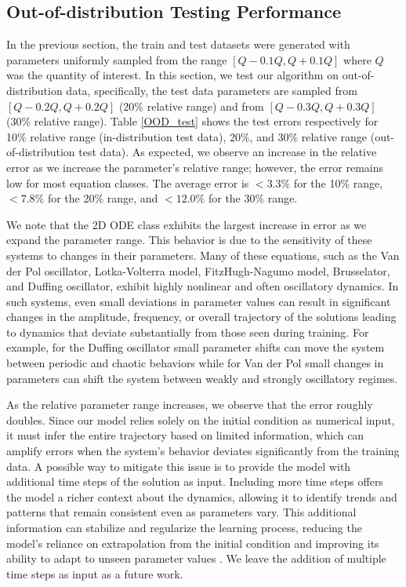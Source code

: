 \documentclass{article}
\begin{document}
\subsection{Out-of-distribution Testing Performance}\label{sec:OOD}
In the previous section, the train and test datasets were generated with parameters uniformly sampled from the range \([Q-0.1Q, Q+0.1Q]\) where $Q$ was the quantity of interest. In this section, we test our algorithm on out-of-distribution data, specifically, the test data parameters are sampled from \([Q-0.2Q, Q+0.2Q]\) (20\% relative range) and from \([Q-0.3Q, Q+0.3Q]\) (30\% relative range).  Table \ref{OOD_test} shows the test errors respectively for 10\% relative range (in-distribution test data), 20\%, and 30\% relative range (out-of-distribution test data). As expected, we observe an increase in the relative error as we increase the parameter's relative range; however, the error remains low for most equation classes. The average error is $<3.3\%$ for the 10\% range, $<7.8\%$ for the 20\% range, and $<12.0\%$ for the 30\% range.

We note that the 2D ODE class exhibits the largest increase in error as we expand the parameter range. This behavior is due to the sensitivity of these systems to changes in their parameters. Many of these equations, such as the Van der Pol oscillator, Lotka-Volterra model, FitzHugh-Nagumo model, Brusselator, and Duffing oscillator, exhibit highly nonlinear and often oscillatory dynamics. In such systems, even small deviations in parameter values can result in significant changes in the amplitude, frequency, or overall trajectory of the solutions leading to dynamics that deviate substantially from those seen during training. For example, for the Duffing oscillator small parameter shifts can move the system between periodic and chaotic behaviors while for Van der Pol small changes in parameters can shift the system between weakly and strongly oscillatory regimes. 

As the relative parameter range increases, we observe that the error roughly doubles. Since our model relies solely on the initial condition as numerical input, it must infer the entire trajectory based on limited information, which can amplify errors when the system's behavior deviates significantly from the training data. A possible way to mitigate this issue is to provide the model with additional time steps of the solution as input. Including more time steps offers the model a richer context about the dynamics, allowing it to identify trends and patterns that remain consistent even as parameters vary. This additional information can stabilize and regularize the learning process, reducing the model's reliance on extrapolation from the initial condition and improving its ability to adapt to unseen parameter values \cite{liu2024prose}. We leave the addition of multiple time steps as input as a future work. 
\end{document}
